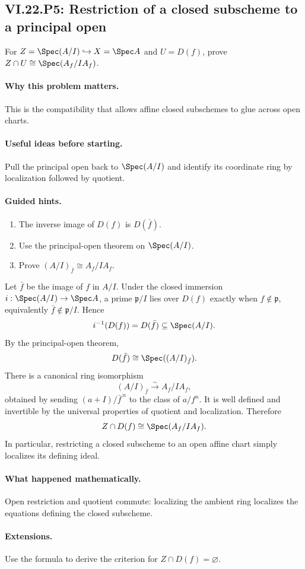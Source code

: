 \subsection*{VI.22.P5: Restriction of a closed subscheme to a principal open}
\begin{problem}\label{prob:vi22-p05}
For $Z=\Spec(A/I)\hookrightarrow X=\Spec A$ and $U=D(f)$, prove $Z\cap U\cong\Spec(A_f/IA_f)$.
\end{problem}

\ifdefined\FullProblemDossiers
\paragraph{Why this problem matters.}
This is the compatibility that allows affine closed subschemes to glue across open charts.

\paragraph{Useful ideas before starting.}
Pull the principal open back to $\Spec(A/I)$ and identify its coordinate ring by localization followed by quotient.

\paragraph{Guided hints.}
\begin{enumerate}
\item The inverse image of $D(f)$ is $D(\bar f)$.
\item Use the principal-open theorem on $\Spec(A/I)$.
\item Prove $(A/I)_{\bar f}\cong A_f/IA_f$.
\end{enumerate}

\begin{solution}
Let $\bar f$ be the image of $f$ in $A/I$.  Under the closed immersion
$i:\Spec(A/I)\to\Spec A$, a prime $\mathfrak p/I$ lies over $D(f)$ exactly when
$f\notin\mathfrak p$, equivalently $\bar f\notin\mathfrak p/I$.  Hence
\[
 i^{-1}(D(f))=D(\bar f)\subseteq\Spec(A/I).
\]
By the principal-open theorem,
\[
 D(\bar f)\cong\Spec((A/I)_{\bar f}).
\]
There is a canonical ring isomorphism
\[
 (A/I)_{\bar f}\xrightarrow{\sim}A_f/IA_f,
\]
obtained by sending $(a+I)/\bar f^{\,n}$ to the class of $a/f^n$.  It is well defined and
invertible by the universal properties of quotient and localization.  Therefore
\[
 Z\cap D(f)\cong\Spec(A_f/IA_f).
\]
In particular, restricting a closed subscheme to an open affine chart simply localizes its
defining ideal.
\end{solution}

\paragraph{What happened mathematically.}
Open restriction and quotient commute: localizing the ambient ring localizes the equations defining the closed subscheme.

\paragraph{Extensions.}
Use the formula to derive the criterion for $Z\cap D(f)=\varnothing$.
\fi
